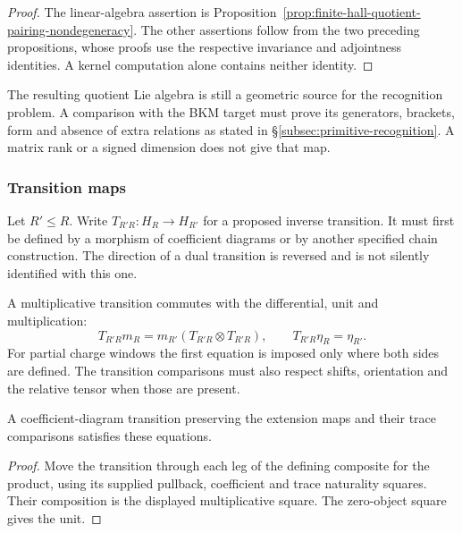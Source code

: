 \begin{proof}
The linear-algebra assertion is
Proposition~\ref{prop:finite-hall-quotient-pairing-nondegeneracy}.
The other assertions follow from the two preceding propositions,
whose proofs use the respective invariance and adjointness
identities. A kernel computation alone contains neither identity.
\end{proof}

The resulting quotient Lie algebra is still a geometric source
for the recognition problem. A comparison with the BKM target
must prove its generators, brackets, form and absence of extra
relations as stated in \S\ref{subsec:primitive-recognition}.
A matrix rank or a signed dimension does not give that map.

\subsubsection*{Transition maps}

Let $R'\leq R$. Write
$T_{R'R}:H_R\to H_{R'}$ for a proposed inverse transition.
It must first be defined by a morphism of coefficient diagrams
or by another specified chain construction. The direction of
a dual transition is reversed and is not silently identified
with this one.

\begin{definition}
\label{def:transition-hall-product-preservation}
A multiplicative transition commutes with the differential,
unit and multiplication:
\[
 T_{R'R}m_R=m_{R'}(T_{R'R}\otimes T_{R'R}),\qquad
 T_{R'R}\eta_R=\eta_{R'}.
\]
For partial charge windows the first equation is imposed only
where both sides are defined. The transition comparisons must
also respect shifts, orientation and the relative tensor when
those are present.
\end{definition}

\begin{proposition}
\label{prop:transition-hall-product-preservation-criterion}
A coefficient-diagram transition preserving the extension
maps and their trace comparisons satisfies these equations.
\end{proposition}

\begin{proof}
Move the transition through each leg of the defining composite
for the product, using its supplied pullback, coefficient and
trace naturality squares. Their composition is the displayed
multiplicative square. The zero-object square gives the unit.
\end{proof}

